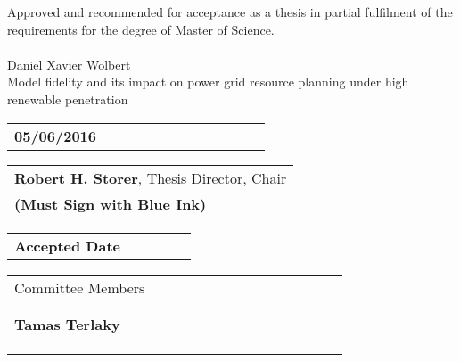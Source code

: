 
\thispagestyle{plain}

Approved and recommended for acceptance as a thesis in partial fulfilment of the requirements for the degree of Master of Science.
\\
\\
Daniel Xavier Wolbert \\
Model fidelity and its impact on power grid resource planning under high renewable penetration

\vspace{.1in}

\begin{tabular}{l}
\\
\hline
\textbf{05/06/2016 \ \ \ \ \ \ \ \ \ \ \ \ \ \ \ \ \ \ \ }
\end{tabular}

\begin{flushright}
\begin{tabular}{l}
\\
\hline
\textbf{Robert H. Storer}, Thesis Director, Chair \\ 
\textbf{(Must Sign with Blue Ink)}
\end{tabular}

\vspace{.05in}

\end{flushright}

\begin{tabular}{l}
\\
\hline
\textbf{Accepted Date \ \ \ \ \ \ \ }
\end{tabular}


\begin{flushright}
\begin{tabular}{l}
Committee Members \ \ \ \ \ \ \ \ \ \ \ \ \ \ \ \ \ \ \ \ \ \ \ \ \ \
\\ 
\\
\\
\hline
\textbf{Tamas Terlaky}\\
\\ 
\\
\\

\end{tabular}
\end{flushright}
\newpage